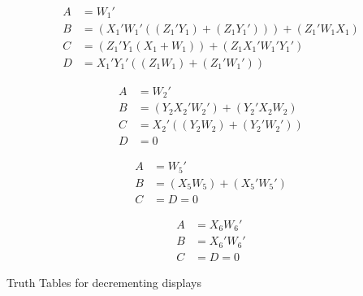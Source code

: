 \begin{table}[t]
\centering

\begin{align}
    A &= W_1' \\
    B &= (X_1' W_1' ((Z_1' Y_1) + (Z_1 Y_1'))) + (Z_1' W_1 X_1) \\
    C &= (Z_1' Y_1 (X_1 + W_1)) + (Z_1 X_1' W_1' Y_1') \\
    D &= X_1' Y_1' ((Z_1 W_1) + (Z_1' W_1')) 
\end{align}

\begin{align}
    A &= W_2' \\
    B &= (Y_2 X_2' W_2') + (Y_2' X_2 W_2) \\
    C &= X_2' ((Y_2 W_2) + (Y_2' W_2')) \\
    D &= 0 
\end{align}

\begin{align}
    A &= W_5' \\
    B &= (X_5 W_5) + (X_5' W_5') \\
    C &=D= 0 
\end{align}

\begin{align}
    A &= X_6 W_6' \\
    B &= X_6' W_6' \\
    C &=D= 0 
\end{align}
\caption{Truth Tables for decrementing displays}
\label{tab:decrement}
\end{table}
